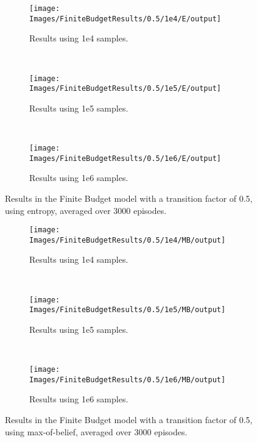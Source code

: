 \begin{figure}[ht]
        \centering
        \begin{subfigure}[t]{0.3\textwidth}
                \texttt{[image: Images/FiniteBudgetResults/0.5/1e4/E/output]}
                \caption{Results using 1e4 samples.}
                \label{fig:fb4e5}
        \end{subfigure}%
        ~ %
        \begin{subfigure}[t]{0.3\textwidth}
                \texttt{[image: Images/FiniteBudgetResults/0.5/1e5/E/output]}
                \caption{Results using 1e5 samples.}
                \label{fig:fb5e5}
        \end{subfigure}
        ~ %
        \begin{subfigure}[t]{0.3\textwidth}
                \texttt{[image: Images/FiniteBudgetResults/0.5/1e6/E/output]}
                \caption{Results using 1e6 samples.}
                \label{fig:fb6e5}
        \end{subfigure}
        \caption{Results in the Finite Budget model with a transition factor of 0.5, using entropy, averaged over 3000 episodes.}
        \label{ref:fbentropyfig5}
\end{figure}

\begin{figure}[ht]
        \centering
        \begin{subfigure}[t]{0.3\textwidth}
                \texttt{[image: Images/FiniteBudgetResults/0.5/1e4/MB/output]}
                \caption{Results using 1e4 samples.}
                \label{fig:fb4m5}
        \end{subfigure}%
        ~ %
        \begin{subfigure}[t]{0.3\textwidth}
                \texttt{[image: Images/FiniteBudgetResults/0.5/1e5/MB/output]}
                \caption{Results using 1e5 samples.}
                \label{fig:fb5m5}
        \end{subfigure}
        ~ %
        \begin{subfigure}[t]{0.3\textwidth}
                \texttt{[image: Images/FiniteBudgetResults/0.5/1e6/MB/output]}
                \caption{Results using 1e6 samples.}
                \label{fig:fb6m5}
        \end{subfigure}
        \caption{Results in the Finite Budget model with a transition factor of 0.5, using max-of-belief, averaged over 3000 episodes.}
        \label{ref:fbmbfig5}
\end{figure}

